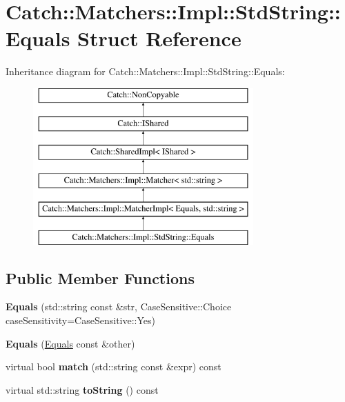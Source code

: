 \hypertarget{structCatch_1_1Matchers_1_1Impl_1_1StdString_1_1Equals}{}\section{Catch\+:\+:Matchers\+:\+:Impl\+:\+:Std\+String\+:\+:Equals Struct Reference}
\label{structCatch_1_1Matchers_1_1Impl_1_1StdString_1_1Equals}
Inheritance diagram for Catch\+:\+:Matchers\+:\+:Impl\+:\+:Std\+String\+:\+:Equals\+:\begin{figure}[H]
\begin{center}
\leavevmode
\includegraphics[height=6.000000cm]{structCatch_1_1Matchers_1_1Impl_1_1StdString_1_1Equals}
\end{center}
\end{figure}
\subsection*{Public Member Functions}
\begin{DoxyCompactItemize}
\item 
\mbox{\label{structCatch_1_1Matchers_1_1Impl_1_1StdString_1_1Equals_a5921d5ed75320fb64a678e3f1292a464}} 
{\bfseries Equals} (std\+::string const \&str, Case\+Sensitive\+::\+Choice case\+Sensitivity=Case\+Sensitive\+::\+Yes)
\item 
\mbox{\label{structCatch_1_1Matchers_1_1Impl_1_1StdString_1_1Equals_acaa97de06aedf363ae803d65a975f5e4}} 
{\bfseries Equals} (\hyperlink{structCatch_1_1Matchers_1_1Impl_1_1StdString_1_1Equals}{Equals} const \&other)
\item 
\mbox{\label{structCatch_1_1Matchers_1_1Impl_1_1StdString_1_1Equals_abf0a94b4e66dbd586268d9983f867e68}} 
virtual bool {\bfseries match} (std\+::string const \&expr) const
\item 
\mbox{\label{structCatch_1_1Matchers_1_1Impl_1_1StdString_1_1Equals_ab0d73961b95d9836d77b9e2e94c3790b}} 
virtual std\+::string {\bfseries to\+String} () const
\end{DoxyCompactItemize}
